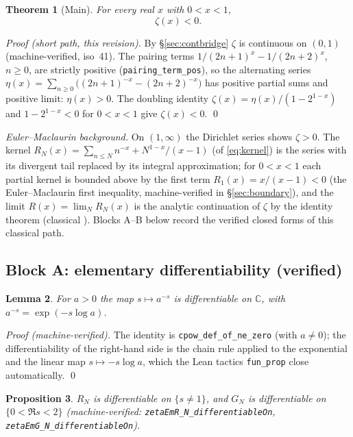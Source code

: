 \documentclass{article}
\newtheorem{theorem}{Theorem}[section]
\newtheorem{lemma}[theorem]{Lemma}
\newtheorem{proposition}[theorem]{Proposition}
\newcommand{\C}{\mathbb{C}}
\newcommand{\zt}{\zeta}
\begin{document}
\begin{theorem}[Main]
\label{thm:main}
For every real $x$ with $0<x<1$,
\[
\zt(x)<0.
\]
\end{theorem}

\emph{Proof (short path, this revision).} By \S\ref{sec:contbridge} $\zt$
is continuous on $(0,1)$ (machine-verified, iso~41). The pairing terms
$1/(2n+1)^x-1/(2n+2)^x$, $n\ge 0$, are strictly positive
(\texttt{pairing\_term\_pos}), so the alternating series
$\eta(x)=\sum_{n\ge 0}\big((2n+1)^{-x}-(2n+2)^{-x}\big)$ has positive
partial sums and positive limit: $\eta(x)>0$. The doubling identity
$\zt(x)=\eta(x)/(1-2^{1-x})$ and $1-2^{1-x}<0$ for $0<x<1$ give
$\zt(x)<0$. \qed

\emph{Euler--Maclaurin background.} On $(1,\infty)$ the Dirichlet series
shows $\zt>0$. The kernel $R_N(x)=\sum_{n\le N}n^{-x}+N^{1-x}/(x-1)$ (of
\eqref{eq:kernel}) is the
series with its divergent tail replaced by its integral approximation; for
$0<x<1$ each partial kernel is bounded above by the first term
$R_1(x)=x/(x-1)<0$ (the Euler--Maclaurin first inequality, machine-verified
in \S\ref{sec:boundary}), and the limit $R(x)=\lim_N R_N(x)$ is the analytic
continuation of $\zt$ by the identity theorem (classical
\cite{whittaker}). Blocks A--B below record
the verified closed forms of this classical path.

\subsection{Block A: elementary differentiability (verified)}
\label{sec:blockA}

\begin{lemma}
\label{lem:cpowderiv}
For $a>0$ the map $s\mapsto a^{-s}$ is differentiable on $\C$, with
$a^{-s}=\exp(-s\log a)$.
\end{lemma}

\emph{Proof (machine-verified).} The identity is
\texttt{cpow\_def\_of\_ne\_zero} (with $a\neq 0$); the differentiability of
the right-hand side is the chain rule applied to the exponential and the
linear map $s\mapsto -s\log a$, which the Lean tactics \texttt{fun\_prop}
close automatically. \qed

\begin{proposition}
\label{prop:blockA}
$R_N$ is differentiable on $\{s\neq 1\}$, and $G_N$ is differentiable on
$\{0<\Re s<2\}$ (machine-verified:
\texttt{zetaEmR\_N\_differentiableOn}, \texttt{zetaEmG\_N\_differentiableOn}).
\end{proposition}
\end{document}
